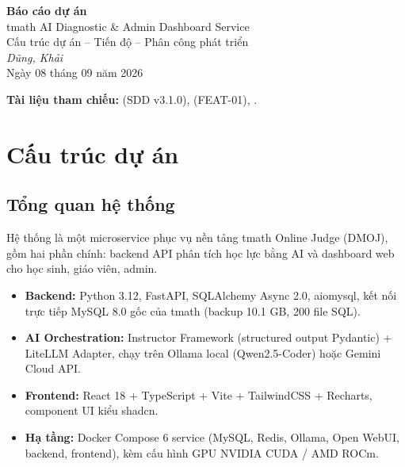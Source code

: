 \documentclass[11pt,a4paper]{article}
\begin{document}
\begin{center}
    {\sffamily\LARGE\bfseries Báo cáo dự án}\\[6pt]
    {\sffamily\Large tmath AI Diagnostic \& Admin Dashboard Service}\\[10pt]
    {\large Cấu trúc dự án -- Tiến độ -- Phân công phát triển}\\[8pt]
    \textit{Dũng, Khải}\\[4pt]
    Ngày 08 tháng 09 năm 2026
\end{center}

\vspace{4pt}
\noindent\textbf{Tài liệu tham chiếu:}  (SDD v3.1.0),  (FEAT-01), .

\tableofcontents
\newpage

\section{Cấu trúc dự án}

\subsection{Tổng quan hệ thống}

Hệ thống là một microservice phục vụ nền tảng tmath Online Judge (DMOJ), gồm hai phần chính: backend API phân tích học lực bằng AI và dashboard web cho học sinh, giáo viên, admin.

\begin{itemize}
    \item \textbf{Backend:} Python 3.12, FastAPI, SQLAlchemy Async 2.0, aiomysql, kết nối trực tiếp MySQL 8.0 gốc của tmath (backup 10.1 GB, 200 file SQL).
    \item \textbf{AI Orchestration:} Instructor Framework (structured output Pydantic) + LiteLLM Adapter, chạy trên Ollama local (Qwen2.5-Coder) hoặc Gemini Cloud API.
    \item \textbf{Frontend:} React 18 + TypeScript + Vite + TailwindCSS + Recharts, component UI kiểu shadcn.
    \item \textbf{Hạ tầng:} Docker Compose 6 service (MySQL, Redis, Ollama, Open WebUI, backend, frontend), kèm cấu hình GPU NVIDIA CUDA / AMD ROCm.
\end{itemize}
\end{document}
